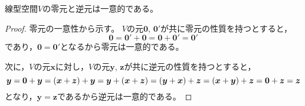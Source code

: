 \documentclass[a4paper,draft]{ltjsarticle}
\begin{document}
\begin{prop}[零元・逆元の一意性]
    線型空間$V$の零元と逆元は一意的である。
    \begin{proof}
        零元の一意性から示す。
        $V$の元$\bm{0}$, $\bm{0}'$が共に零元の性質を持つとすると，
        \begin{equation}
            \bm{0}=\bm{0}'+\bm{0}=\bm{0}+\bm{0}'=\bm{0}'
        \end{equation}
        であり，$\bm{0}=\bm{0}'$となるから零元は一意的である。

        次に，$V$の元$\bm{x}$に対し，$V$の元$\bm{y}$, $\bm{z}$が共に逆元の性質を持つとすると，
        \begin{equation}
            \bm{y}=\bm{0}+\bm{y}=\pare{\bm{x}+\bm{z}}+\bm{y}
            =\bm{y}+\pare{\bm{x}+\bm{z}}=\pare{\bm{y}+\bm{x}}+\bm{z}
            =\pare{\bm{x}+\bm{y}}+\bm{z}=\bm{0}+\bm{z}=\bm{z}
        \end{equation}
        となり，$\bm{y}=\bm{z}$であるから逆元は一意的である。
    \end{proof}
\end{prop}
\fi
\end{document}
